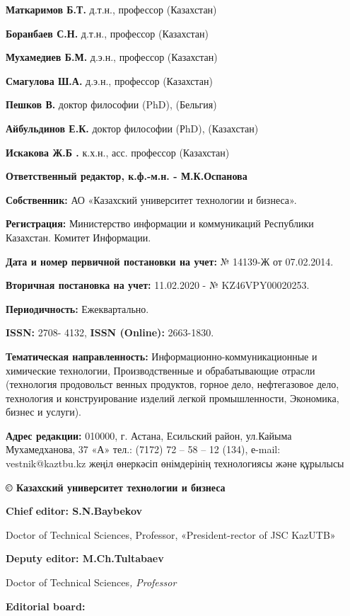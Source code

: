 \textbf{Маткаримов Б.Т.} д.т.н., профессор (Казахстан)

\textbf{Боранбаев С.Н.} д.т.н., профессор (Казахстан)

\textbf{Мухамедиев Б.М.} д.э.н., профессор (Казахстан)

\textbf{Смагулова Ш.А.} д.э.н., профессор (Казахстан)

\textbf{Пешков В.} доктор философии (PhD), (Бельгия)

\textbf{Айбульдинов Е.К.} доктор философии (РhD), (Казахстан)

\textbf{Искакова Ж.Б .} к.х.н., асс. профессор (Казахстан)

\begin{center}
\textbf{Ответственный редактор, к.ф.-м.н. - М.К.Оспанова}
\end{center}

\textbf{Собственник:} АО «Казахский университет технологии и бизнеса».

\textbf{Регистрация:} Министерство информации и коммуникаций Республики
Казахстан. Комитет Информации.

\textbf{Дата и номер первичной постановки на учет:} № 14139-Ж от
07.02.2014.

\textbf{Вторичная постановка на учет:} 11.02.2020 - № KZ46VPY00020253.

\textbf{Периодичность:} Ежеквартально.

\textbf{ISSN:} 2708- 4132, \textbf{ISSN (Online):} 2663-1830.

\textbf{Тематическая направленность:} Информационно-коммуникационные и
химические технологии, Производственные и обрабатывающие отрасли (технология
продовольст венных продуктов, горное дело, нефтегазовое дело, технология и
конструирование изделий легкой промышленности, Экономика, бизнес и
услуги).

\textbf{Адрес редакции:} 010000, г. Астана, Есильский район, ул.Кайыма
Мухамедханова, 37 «А» тел.: (7172) 72 -- 58 -- 12 (134), е-mail: vestnik@kaztbu.kz
жеңіл өнеркәсіп өнімдерінің технологиясы және құрылысы

\begin{center}
\textbf{\large © Казахский университет технологии и бизнеса}
\end{center}

\pagebreak

\begin{center}
\textbf{Chief editor: S.N.Baybekov}

Doctor of Technical Sciences, Professor, «President-rector of JSC
KazUTB»

\textbf{Deputy editor: M.Ch.Tultabaev}

Doctor of Technical Sciences\emph{, Professor}

\textbf{Editorial board:}
\end{center}

